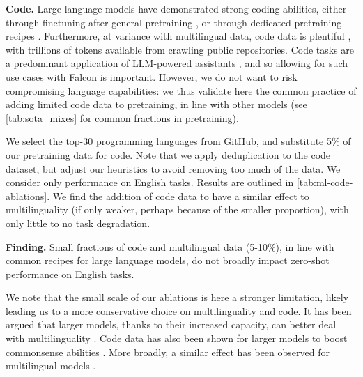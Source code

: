 \documentclass{article}
\begin{document}
\textbf{Code.} Large language models have demonstrated strong coding abilities, either through finetuning after general pretraining \citep{chen2021evaluating, palm, roziere2023code}, or through dedicated pretraining recipes \citep{li2023starcoder}. Furthermore, at variance with multilingual data, code data is plentiful \citep{kocetkov2022stack}, with trillions of tokens available from crawling public repositories. Code tasks are a predominant application of LLM-powered assistants \citep{luo2023wizardcoder}, and so allowing for such use cases with Falcon is important. However, we do not want to risk compromising language capabilities: we thus validate here the common practice of adding limited code data to pretraining, in line with other models (see \cref{tab:sota_mixes} for common fractions in pretraining).

We select the top-30 programming languages from GitHub, and substitute 5\% of our pretraining data for code. Note that we apply deduplication to the code dataset, but adjust our heuristics to avoid removing too much of the data. We consider only performance on English tasks. Results are outlined in \cref{tab:ml-code-ablations}. We find the addition of code data to have a similar effect to multilinguality (if only weaker, perhaps because of the smaller proportion), with only little to no task degradation.

\begin{mdframed}
\textbf{Finding.} Small fractions of code and multilingual data (5-10\%), in line with common recipes for large language models, do not broadly impact zero-shot performance on English tasks.
\end{mdframed}

We note that the small scale of our ablations is here a stronger limitation, likely leading us to a more conservative choice on multilinguality and code. It has been argued that larger models, thanks to their increased capacity, can better deal with multilinguality \citep{shaham2022causes}. Code data has also been shown for larger models to boost commonsense abilities \citep{madaan2022language}. More broadly, a similar effect has been observed for multilingual models \citep{aghajanyan2023scaling}.
\end{document}
